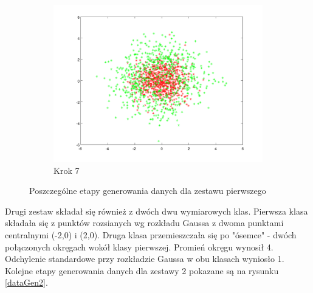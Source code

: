 \documentclass[10pt,a4paper]{article}
\begin{document}
\begin{figure}[H]
  \begin{center}
  \begin{subfigure}[b]{0.4\textwidth}
    \includegraphics[width=\textwidth]{dataGen_step6.png}
    \caption{Krok 7}
  \end{subfigure}
  \end{center}
  
  \caption{Poszczególne etapy generowania danych dla zestawu pierwszego}
  \label{dataGen}
  
\end{figure}

Drugi zestaw składał się również z dwóch dwu wymiarowych klas. Pierwsza klasa składała się z punktów rozsianych wg rozkładu Gaussa z dwoma punktami centralnymi (-2,0) i (2,0). Druga klasa przemieszczała się po "ósemce" - dwóch połączonych okręgach wokół klasy pierwszej. Promień okręgu wynosił 4. Odchylenie standardowe przy rozkładzie Gaussa w obu klasach wyniosło 1. Kolejne etapy generowania danych dla zestawy 2 pokazane są na rysunku \ref{dataGen2}. 
\end{document}
